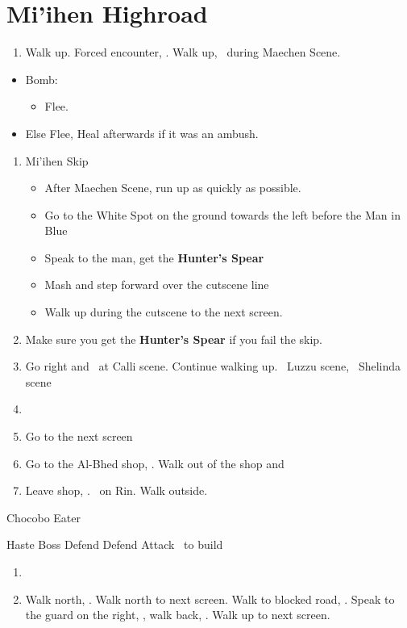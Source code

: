 \chapter{Mi'ihen Highroad}

\begin{enumerate}
	\item Walk up. Forced encounter, \sd. Walk up, \sd\ during Maechen Scene.
\end{enumerate}
\begin{encounters}
	\begin{itemize}
		\item Bomb:
		\begin{itemize}
			\kimahrif Lancet Bomb, learn \textbf{Self Destruct}
			\item Flee.
		\end{itemize}
		\item Else Flee,  Heal afterwards if it was an ambush.
	\end{itemize}
\end{encounters}
\begin{enumerate}[resume]
	\item {Mi'ihen Skip}
	\begin{itemize}
		\item After Maechen Scene, run up as quickly as possible.
		\item Go to the White Spot on the ground towards the left before the Man in Blue
		\item Speak to the man, get the \textbf{Hunter's Spear}
		\item Mash and step forward over the cutscene line
		\item Walk up during the cutscene to the next screen.
	\end{itemize}
	\item Make sure you get the \textbf{Hunter's Spear} if you fail the skip.
	\item Go right and \sd\ at Calli scene. Continue walking up. \sd\ Luzzu scene, \sd\ Shelinda scene
	\item \formation{\tidus}{\yuna}{\auron}
	\item Go to the next screen
	\item Go to the Al-Bhed shop, \sd. Walk out of the shop and \cs[5:30]
	\item Leave shop, \sd. \sd\ on Rin. Walk outside.
\end{enumerate}
\begin{battle}{Chocobo Eater}
	\begin{itemize}
		\tidusf Haste Boss
		\tidusf Defend
		\auronf Defend
		\yunaf Attack \yuna\ to build \od
	\end{itemize}
\end{battle}
\begin{enumerate}[resume]
	\item \sd
	\item Walk north, \save. Walk north to next screen. Walk to blocked road, \sd. Speak to the guard on the right, \sd, walk back, \sd. Walk up to next screen.
\end{enumerate}